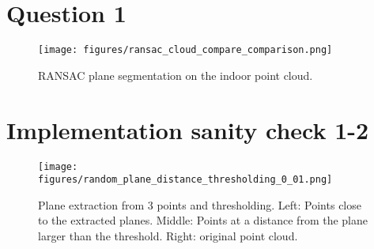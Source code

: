 \documentclass[a4paper]{article}
\begin{document}





\section*{Question 1}
\begin{figure}[ht]
  \centering
  \texttt{[image: figures/ransac\_cloud\_compare\_comparison.png]}
  \caption{RANSAC plane segmentation on the indoor point cloud.}
  \label{fig:ransac_overview}
\end{figure}



\section*{Implementation sanity check 1-2}
\begin{figure}[ht]
  \centering
  \texttt{[image: figures/random\_plane\_distance\_thresholding\_0\_01.png]}
  \caption{Plane extraction from 3 points and thresholding. Left: Points close to the extracted planes. Middle: Points at a distance from the plane larger than the threshold. Right: original point cloud. }
  \label{fig:sanity_check_planes}
\end{figure}
\end{document}
